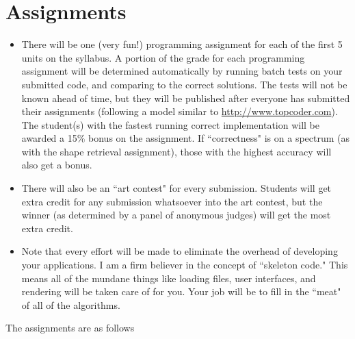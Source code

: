 \documentclass{article}
\begin{document}
\section{Assignments}

\begin{itemize}
\item There will be one (very fun!) programming assignment for each of the first 5 units on the syllabus.  A portion of the grade for each programming assignment will be determined automatically by running batch tests on your submitted code, and comparing to the correct solutions. The tests will not be known ahead of time, but they will be published after everyone has submitted their assignments (following a model similar to \url{http://www.topcoder.com}). The student(s) with the fastest running correct implementation will be awarded a 15$\%$ bonus on the assignment. If ``correctness" is on a spectrum (as with the shape retrieval assignment), those with the highest accuracy will also get a bonus.

\item There will also be an ``art contest" for every submission. Students will get extra credit for any submission whatsoever into the art contest, but the winner (as determined by a panel of anonymous judges) will get the most extra credit.

\item Note that every effort will be made to eliminate the overhead of developing your applications.  I am a firm believer in the concept of ``skeleton code."  This means all of the mundane things like loading files, user interfaces, and rendering will be taken care of for you.  Your job will be to fill in the ``meat" of all of the algorithms.
\end{itemize}

The assignments are as follows
\end{document}
